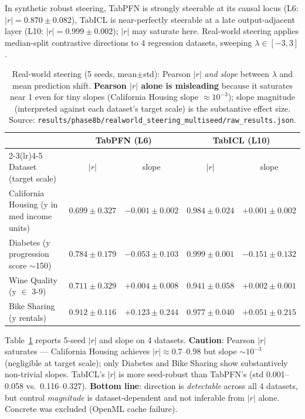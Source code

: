 \documentclass{article}
\begin{document}
In synthetic robust steering, TabPFN is strongly steerable at its causal locus (L6: $|r| = 0.870 \pm 0.082$), TabICL is near-perfectly steerable at a late output-adjacent layer (L10: $|r| = 0.999 \pm 0.002$); $|r|$ may saturate here. Real-world steering applies median-split contrastive directions to 4 regression datasets, sweeping $\lambda \in [-3, 3]$.

\begin{table}[t]
\centering
\caption{Real-world steering (5 seeds, mean$\pm$std): Pearson $|r|$ \emph{and slope} between $\lambda$ and mean prediction shift. \textbf{Pearson $|r|$ alone is misleading} because it saturates near 1 even for tiny slopes (California Housing slope $\approx 10^{-3}$); slope magnitude (interpreted against each dataset's target scale) is the substantive effect size. Source: \texttt{results/phase8b/realworld\_steering\_multiseed/raw\_results.json}.}
\label{tab:realworld-steering}
\footnotesize
\begin{tabular}{@{}l cc cc@{}}
\toprule
 & \multicolumn{2}{c}{TabPFN (L6)} & \multicolumn{2}{c}{TabICL (L10)} \\
\cmidrule(lr){2-3}\cmidrule(lr){4-5}
Dataset (target scale) & $|r|$ & slope & $|r|$ & slope \\
\midrule
California Housing (y in med income units) & $0.699 {\pm} 0.327$ & $-0.001 {\pm} 0.002$ & $0.984 {\pm} 0.024$ & $+0.001 {\pm} 0.002$ \\
Diabetes (y progression score $\sim$150) & $0.784 {\pm} 0.179$ & $-0.053 {\pm} 0.103$ & $0.999 {\pm} 0.001$ & $-0.151 {\pm} 0.132$ \\
Wine Quality (y $\in$ 3-9) & $0.711 {\pm} 0.329$ & $+0.004 {\pm} 0.008$ & $0.941 {\pm} 0.058$ & $+0.002 {\pm} 0.001$ \\
Bike Sharing (y rentals) & $0.912 {\pm} 0.116$ & $+0.123 {\pm} 0.244$ & $0.977 {\pm} 0.040$ & $+0.051 {\pm} 0.215$ \\
\bottomrule
\end{tabular}
\end{table}

Table~\ref{tab:realworld-steering} reports 5-seed $|r|$ and slope on 4 datasets. \textbf{Caution}: Pearson $|r|$ saturates --- California Housing achieves $|r| \approx 0.7$--$0.98$ but slope $\sim 10^{-3}$ (negligible at target scale); only Diabetes and Bike Sharing show substantively non-trivial slopes. TabICL's $|r|$ is more seed-robust than TabPFN's (std 0.001--0.058 vs.\ 0.116--0.327). \textbf{Bottom line}: direction is \emph{detectable} across all 4 datasets, but control \emph{magnitude} is dataset-dependent and not inferable from $|r|$ alone. Concrete was excluded (OpenML cache failure).
\end{document}
